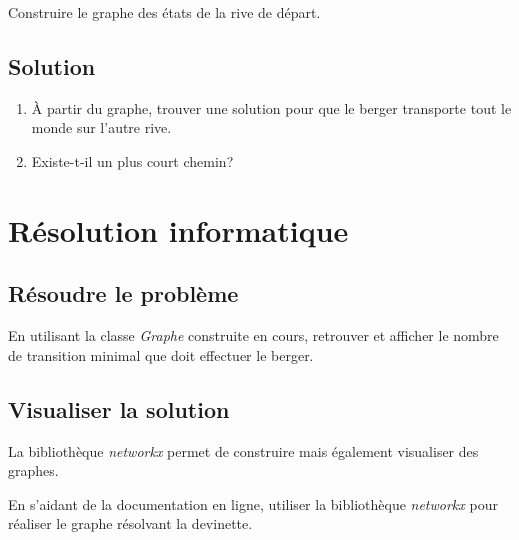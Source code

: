 \documentclass[a4paper,11pt]{article}
\begin{document}
\begin{Form}
\begin{center}
\label{transition}
\end{center}
\begin{activite}
Construire le graphe des états de la rive de départ.
\end{activite}
\subsection{Solution}
\begin{activite}
\begin{enumerate}
\item À partir du graphe, trouver une solution pour que le berger transporte tout le monde sur l'autre rive.
\item Existe-t-il un plus court chemin?
\end{enumerate}
\end{activite}
\section{Résolution informatique}
\subsection{Résoudre le problème}
\begin{activite}
En utilisant la classe \emph{Graphe} construite en cours, retrouver et afficher le nombre de transition minimal que doit effectuer le berger.
\end{activite}
\subsection{Visualiser la solution}
La bibliothèque \emph{networkx} permet de construire mais également visualiser des graphes. 
\begin{activite}
En s'aidant de la documentation en ligne, utiliser la bibliothèque \emph{networkx} pour réaliser le graphe résolvant la devinette.
\end{activite}
\end{Form}
\end{document}
